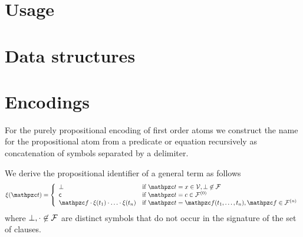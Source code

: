 

\section{Usage}\label{sec:flea:usage}

\section{Data structures}\label{sec:flea:details}


\section{Encodings}\label{sec:flea:encodings}


For the purely propositional encoding of first order atoms
we construct the name for the propositional atom
from a predicate or equation recursively as concatenation of symbols
separated by a delimiter.

\begin{definition}
	We derive the propositional identifier of a general term as follows
\begin{gather*}
	\MDEFINE{\xi(\mct)}{ll}{
	\bot &\text{if } \mct=x\in\mcV, \bot\not\in\mcF
	\tag*{}\\
	\mc &\text{if } \mct=c\in\mcFn[0]\\
	\mcf\encsep\xi(t_1)\encsep\ldots\encsep\xi(t_n) &\text{if }\mct=\mcf(t_1,\ldots,t_n), \mcf\in\mcFn
}
\end{gather*}
where \( \bot, \cdot\not\in\mathcal{F} \) are distinct symbols that do not occur in the signature of the set of clauses.
\end{definition}


